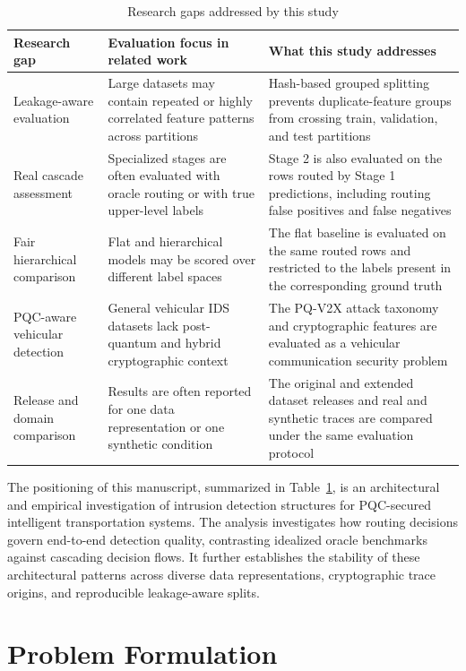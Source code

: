 \documentclass{IEEEoj}
\begin{document}
\begin{table}[!t]
\caption{Research gaps addressed by this study}
\label{tab:research_gaps}
\centering
\small
\begin{tabularx}{\textwidth}{p{} p{} X}
\toprule
Research gap & Evaluation focus in related work & What this study addresses \\
\midrule
Leakage-aware evaluation & Large datasets may contain repeated or highly correlated feature patterns across partitions & Hash-based grouped splitting prevents duplicate-feature groups from crossing train, validation, and test partitions \\
Real cascade assessment & Specialized stages are often evaluated with oracle routing or with true upper-level labels & Stage 2 is also evaluated on the rows routed by Stage 1 predictions, including routing false positives and false negatives \\
Fair hierarchical comparison & Flat and hierarchical models may be scored over different label spaces & The flat baseline is evaluated on the same routed rows and restricted to the labels present in the corresponding ground truth \\
PQC-aware vehicular detection & General vehicular IDS datasets lack post-quantum and hybrid cryptographic context & The PQ-V2X attack taxonomy and cryptographic features are evaluated as a vehicular communication security problem \\
Release and domain comparison & Results are often reported for one data representation or one synthetic condition & The original and extended dataset releases and real and synthetic traces are compared under the same evaluation protocol \\
\bottomrule
\end{tabularx}
\end{table}

The positioning of this manuscript, summarized in Table~\ref{tab:research_gaps},
is an architectural and empirical investigation of intrusion detection structures
for PQC-secured intelligent transportation systems. The analysis investigates how
routing decisions govern end-to-end detection quality, contrasting idealized
oracle benchmarks against cascading decision flows. It further establishes
the stability of these architectural patterns across diverse data representations,
cryptographic trace origins, and reproducible leakage-aware splits.

\section{Problem Formulation}
\label{sec:problem_formulation}
\end{document}
